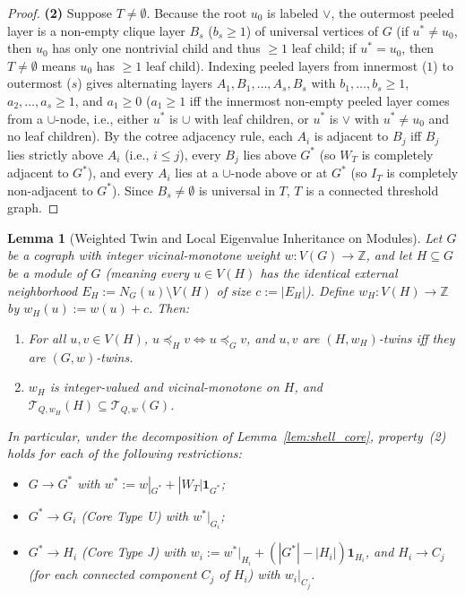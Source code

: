 \documentclass[11pt,a4paper]{article}
\newtheorem{lemma}[theorem]{Lemma}
\theoremstyle{definition}
\begin{document}
\begin{proof}
  \textbf{(2)} Suppose $T \ne \emptyset$. Because the root $u_0$ is labeled $\vee$, the outermost peeled layer is a non-empty clique layer $B_s$ ($b_s \ge 1$) of universal vertices of $G$ (if $u^* \ne u_0$, then $u_0$ has only one nontrivial child and thus $\ge 1$ leaf child; if $u^* = u_0$, then $T \ne \emptyset$ means $u_0$ has $\ge 1$ leaf child). Indexing peeled layers from innermost ($1$) to outermost ($s$) gives alternating layers $A_1, B_1, \dots, A_s, B_s$ with $b_1,\dots,b_s \ge 1$, $a_2,\dots,a_s \ge 1$, and $a_1 \ge 0$ ($a_1 \ge 1$ iff the innermost non-empty peeled layer comes from a $\cup$-node, i.e., either $u^*$ is $\cup$ with leaf children, or $u^*$ is $\vee$ with $u^* \ne u_0$ and no leaf children). By the cotree adjacency rule, each $A_i$ is adjacent to $B_j$ iff $B_j$ lies strictly above $A_i$ (i.e., $i \le j$), every $B_j$ lies above $G^*$ (so $W_T$ is completely adjacent to $G^*$), and every $A_i$ lies at a $\cup$-node above or at $G^*$ (so $I_T$ is completely non-adjacent to $G^*$). Since $B_s \ne \emptyset$ is universal in $T$, $T$ is a connected threshold graph.
\end{proof}

\begin{lemma}[Weighted Twin and Local Eigenvalue Inheritance on Modules]\label{lem:inherit}
  Let $G$ be a cograph with integer vicinal-monotone weight $w : V(G) \to \mathbb{Z}$, and let $H \subseteq G$ be a \emph{module} of $G$ (meaning every $u \in V(H)$ has the identical external neighborhood $E_H := N_G(u) \setminus V(H)$ of size $c := |E_H|$). Define $w_H : V(H) \to \mathbb{Z}$ by $w_H(u) := w(u) + c$. Then:
  \begin{enumerate}
    \item For all $u, v \in V(H)$, $u \preceq_H v \iff u \preceq_G v$, and $u, v$ are $(H, w_H)$-twins iff they are $(G, w)$-twins.
    \item $w_H$ is integer-valued and vicinal-monotone on $H$, and $\mathcal{T}_{Q, w_H}(H) \subseteq \mathcal{T}_{Q, w}(G)$.
  \end{enumerate}
  In particular, under the decomposition of Lemma~\ref{lem:shell_core}, property~(2) holds for each of the following restrictions:
  \begin{itemize}
    \item $G \to G^*$ with $w^* := w|_{G^*} + |W_T|\mathbf{1}_{G^*}$;
    \item $G^* \to G_i$ (Core Type U) with $w^*|_{G_i}$;
    \item $G^* \to H_i$ (Core Type J) with $w_i := w^*|_{H_i} + (|G^*| - |H_i|)\mathbf{1}_{H_i}$, and $H_i \to C_j$ (for each connected component $C_j$ of $H_i$) with $w_i|_{C_j}$.
  \end{itemize}
\end{lemma}
\end{document}
